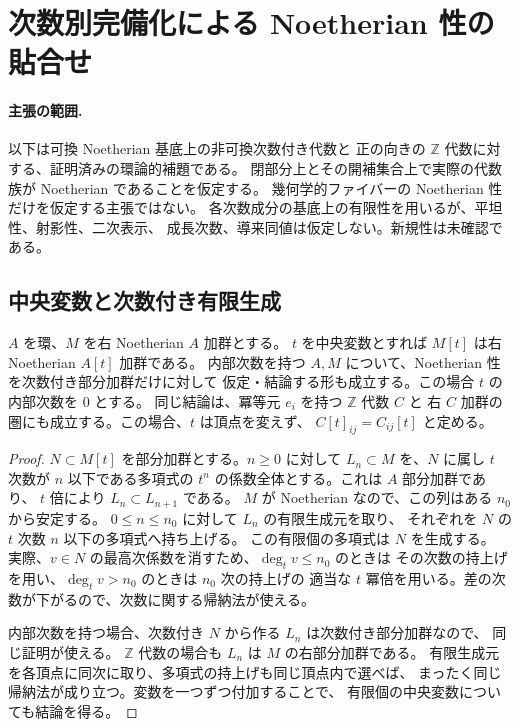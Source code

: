 \section{次数別完備化による Noetherian 性の貼合せ}
\label{sec:formal-noetherian-patching}

\paragraph{主張の範囲.}
以下は可換 Noetherian 基底上の非可換次数付き代数と
正の向きの $\mathbb Z$ 代数に対する、証明済みの環論的補題である。
閉部分上とその開補集合上で実際の代数族が Noetherian であることを仮定する。
幾何学的ファイバーの Noetherian 性だけを仮定する主張ではない。
各次数成分の基底上の有限性を用いるが、平坦性、射影性、二次表示、
成長次数、導来同値は仮定しない。新規性は未確認である。

\subsection{中央変数と次数付き有限生成}

\begin{lemma}
\label{lem:patch-central-variable}
$A$ を環、$M$ を右 Noetherian $A$ 加群とする。
$t$ を中央変数とすれば $M[t]$ は右 Noetherian $A[t]$ 加群である。
内部次数を持つ $A,M$ について、Noetherian 性を次数付き部分加群だけに対して
仮定・結論する形も成立する。この場合 $t$ の内部次数を $0$ とする。
同じ結論は、冪等元 $e_i$ を持つ $\mathbb Z$ 代数 $C$ と
右 $C$ 加群の圏にも成立する。この場合、$t$ は頂点を変えず、
$C[t]_{ij}=C_{ij}[t]$ と定める。
\end{lemma}

\begin{proof}
$N\subset M[t]$ を部分加群とする。$n\geq0$ に対して
$L_n\subset M$ を、$N$ に属し $t$ 次数が $n$ 以下である多項式の
$t^n$ の係数全体とする。これは $A$ 部分加群であり、
$t$ 倍により $L_n\subset L_{n+1}$ である。
$M$ が Noetherian なので、この列はある $n_0$ から安定する。
$0\leq n\leq n_0$ に対して $L_n$ の有限生成元を取り、
それぞれを $N$ の $t$ 次数 $n$ 以下の多項式へ持ち上げる。
この有限個の多項式は $N$ を生成する。
実際、$v\in N$ の最高次係数を消すため、$\deg_t v\leq n_0$ のときは
その次数の持上げを用い、$\deg_t v>n_0$ のときは $n_0$ 次の持上げの
適当な $t$ 冪倍を用いる。差の次数が下がるので、次数に関する帰納法が使える。

内部次数を持つ場合、次数付き $N$ から作る $L_n$ は次数付き部分加群なので、
同じ証明が使える。
$\mathbb Z$ 代数の場合も $L_n$ は $M$ の右部分加群である。
有限生成元を各頂点に同次に取り、多項式の持上げも同じ頂点内で選べば、
まったく同じ帰納法が成り立つ。変数を一つずつ付加することで、
有限個の中央変数についても結論を得る。
\end{proof}

